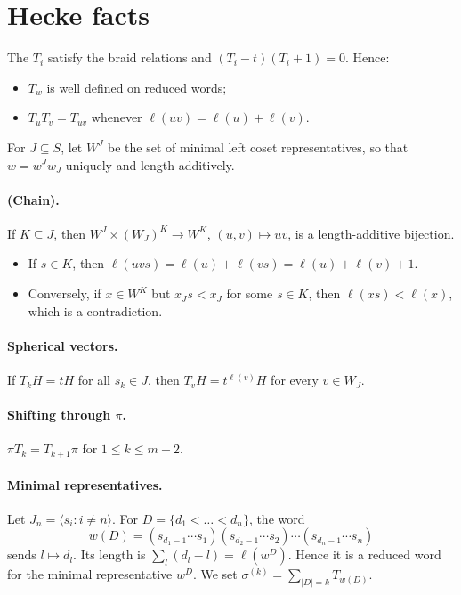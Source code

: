 \documentclass[11pt]{amsart}
\theoremstyle{remark}
\begin{document}
\section{Hecke facts}

The $T_i$ satisfy the braid relations and $(T_i-t)(T_i+1)=0$. Hence:
\begin{itemize}
\item $T_w$ is well defined on reduced words;
\item $T_uT_v=T_{uv}$ whenever $\ell(uv)=\ell(u)+\ell(v)$.
\end{itemize}

For $J\subseteq S$, let $W^J$ be the set of minimal left coset representatives, so that $w=w^Jw_J$ uniquely and length-additively.

\paragraph{(Chain).} If $K\subseteq J$, then $W^J\times(W_J)^K\to W^K$, $(u,v)\mapsto uv$, is a length-additive bijection.
\begin{itemize}
\item If $s\in K$, then $\ell(uvs)=\ell(u)+\ell(vs)=\ell(u)+\ell(v)+1$.
\item Conversely, if $x\in W^K$ but $x_Js<x_J$ for some $s\in K$, then $\ell(xs)<\ell(x)$, which is a contradiction.
\end{itemize}

\paragraph{Spherical vectors.} If $T_kH=tH$ for all $s_k\in J$, then $T_vH=t^{\ell(v)}H$ for every $v\in W_J$.

\paragraph{Shifting through $\pi$.} $\pi T_k=T_{k+1}\pi$ for $1\le k\le m-2$.

\paragraph{Minimal representatives.} Let $J_n=\langle s_i:i\ne n\rangle$. For $D=\{d_1<\dots<d_n\}$, the word
\[
w(D)=(s_{d_1-1}\cdots s_1)(s_{d_2-1}\cdots s_2)\cdots(s_{d_n-1}\cdots s_n)
\]
sends $l\mapsto d_l$. Its length is $\sum_l(d_l-l)=\ell(w^D)$. Hence it is a reduced word for the minimal representative $w^D$. We set $\sigma^{(k)}=\sum_{|D|=k}T_{w(D)}$.
\end{document}
